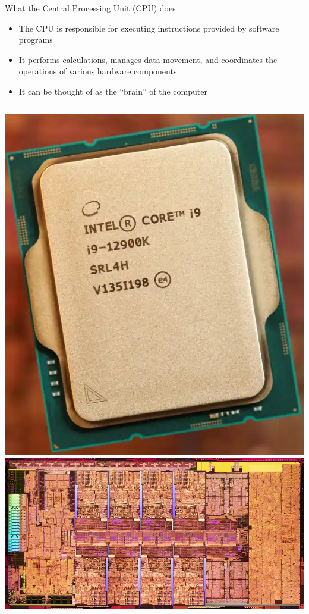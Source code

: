 \documentclass[12pt, aspectration=169]{beamer}
\begin{document}
    \begin{frame}{What the Central Processing Unit (CPU) does}
        \begin{itemize}
            \item The CPU is responsible for executing instructions provided by software programs
            \item It performs calculations, manages data movement, and coordinates the operations of various hardware components
            \item It can be thought of as the ``brain'' of the computer
        \end{itemize}
        \begin{center}
            \begin{columns}
                \includegraphics[scale=0.25]{static/images/12th_Gen_Core_i9_12900K_Hero_Close_Up}
                \includegraphics[scale=0.25]{static/images/900px-alder_lake_die_2}
            \end{columns}
        \end{center}
    \end{frame}
\end{document}
